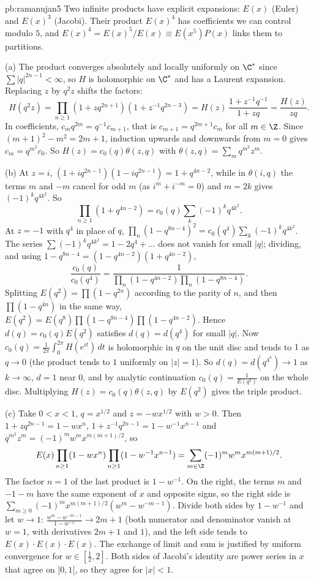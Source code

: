 \begin{solution}{pb:ramanujan5}
\idea Two infinite products have explicit expansions: $E(x)$ (Euler) and $E(x)^3$ (Jacobi). Their product $E(x)^4$ has
coefficients we can control modulo $5$, and $E(x)^4=E(x)^5/E(x)\equiv E(x^5)P(x)$ links them to partitions.

\writeup (a) The product converges absolutely and locally uniformly on $\C^*$ since $\sum|q|^{2n-1}<\infty$, so $H$ is holomorphic on
$\C^*$ and has a Laurent expansion. Replacing $z$ by $q^2z$ shifts the factors:
\[
H(q^2z)=\prod_{n\ge1}(1+zq^{2n+1})(1+z^{-1}q^{2n-3})=H(z)\,\frac{1+z^{-1}q^{-1}}{1+zq}=\frac{H(z)}{zq}.
\]
In coefficients, $c_mq^{2m}=q^{-1}c_{m+1}$, that is $c_{m+1}=q^{2m+1}c_m$ for all $m\in\Z$. Since $(m+1)^2-m^2=2m+1$, induction upwards
and downwards from $m=0$ gives $c_m=q^{m^2}c_0$. So $H(z)=c_0(q)\theta(z,q)$ with $\theta(z,q)=\sum_mq^{m^2}z^m$.

(b) At $z=i$, $(1+iq^{2n-1})(1-iq^{2n-1})=1+q^{4n-2}$, while in $\theta(i,q)$ the terms $m$ and $-m$ cancel for odd $m$ (as
$i^m+i^{-m}=0$) and $m=2k$ gives $(-1)^kq^{4k^2}$. So
\[
\prod_{n\ge1}(1+q^{4n-2})=c_0(q)\sum_k(-1)^kq^{4k^2}.
\]
At $z=-1$ with $q^4$ in place of $q$, $\prod_n(1-q^{8n-4})^2=c_0(q^4)\sum_k(-1)^kq^{4k^2}$. The series $\sum(-1)^kq^{4k^2}=1-2q^4+\dots$ does
not vanish for small $|q|$; dividing, and using $1-q^{8n-4}=(1-q^{4n-2})(1+q^{4n-2})$,
\[
\frac{c_0(q)}{c_0(q^4)}=\frac1{\prod_n(1-q^{4n-2})\prod_n(1-q^{8n-4})}.
\]
Splitting $E(q^2)=\prod(1-q^{2n})$ according to the parity of $n$, and then $\prod(1-q^{4n})$ in the same way,
$E(q^2)=E(q^8)\prod(1-q^{8n-4})\prod(1-q^{4n-2})$. Hence $d(q)=c_0(q)E(q^2)$ satisfies $d(q)=d(q^4)$ for small $|q|$. Now
$c_0(q)=\frac1{2\pi}\int_0^{2\pi}H(e^{it})\,dt$ is holomorphic in $q$ on the unit disc and tends to $1$ as $q\to0$ (the product tends to
$1$ uniformly on $|z|=1$). So $d(q)=d(q^{4^k})\to1$ as $k\to\infty$, $d=1$ near $0$, and by analytic continuation $c_0(q)=\frac1{E(q^2)}$
on the whole disc. Multiplying $H(z)=c_0(q)\theta(z,q)$ by $E(q^2)$ gives the triple product.

(c) Take $0<x<1$, $q=x^{1/2}$ and $z=-wx^{1/2}$ with $w>0$. Then $1+zq^{2n-1}=1-wx^n$, $1+z^{-1}q^{2n-1}=1-w^{-1}x^{n-1}$ and
$q^{m^2}z^m=(-1)^mw^mx^{m(m+1)/2}$, so
\[
E(x)\prod_{n\ge1}(1-wx^n)\prod_{n\ge1}(1-w^{-1}x^{n-1})=\sum_{m\in\Z}(-1)^mw^mx^{m(m+1)/2}.
\]
The factor $n=1$ of the last product is $1-w^{-1}$. On the right, the terms $m$ and $-1-m$ have the same exponent of $x$ and
opposite signs, so the right side is $\sum_{m\ge0}(-1)^mx^{m(m+1)/2}(w^m-w^{-m-1})$. Divide both sides by $1-w^{-1}$ and let $w\to1$:
$\frac{w^m-w^{-m-1}}{1-w^{-1}}\to2m+1$ (both numerator and denominator vanish at $w=1$, with derivatives $2m+1$ and $1$), and the left
side tends to $E(x)\cdot E(x)\cdot E(x)$. The exchange of limit and sum is justified by uniform convergence for $w\in[\frac12,2]$.
Both sides of Jacobi's identity are power series in $x$ that agree on $]0,1[$, so they agree for $|x|<1$.


\end{solution}
